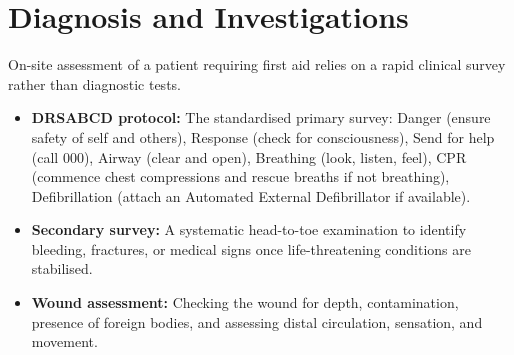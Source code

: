 \section*{Diagnosis and Investigations}
On-site assessment of a patient requiring first aid relies on a rapid clinical survey rather than diagnostic tests.
\begin{itemize}
    \item \textbf{DRSABCD protocol:} The standardised primary survey: Danger (ensure safety of self and others), Response (check for consciousness), Send for help (call 000), Airway (clear and open), Breathing (look, listen, feel), CPR (commence chest compressions and rescue breaths if not breathing), Defibrillation (attach an Automated External Defibrillator if available).
    \item \textbf{Secondary survey:} A systematic head-to-toe examination to identify bleeding, fractures, or medical signs once life-threatening conditions are stabilised.
    \item \textbf{Wound assessment:} Checking the wound for depth, contamination, presence of foreign bodies, and assessing distal circulation, sensation, and movement.
\end{itemize}

